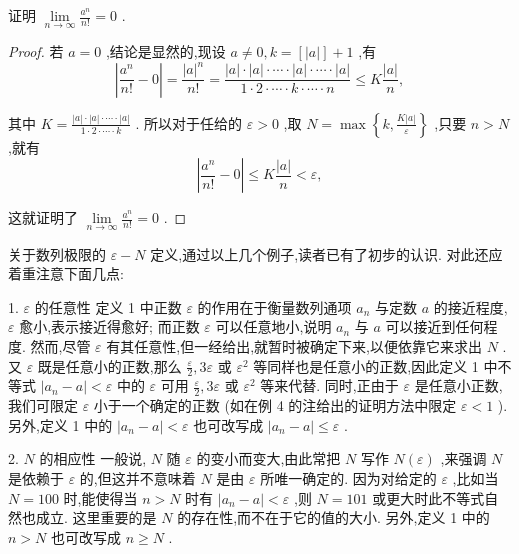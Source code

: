 \begin{example}
证明 \(\mathop{\lim }\limits_{{n \rightarrow  \infty }}\frac{{a}^{n}}{n!} = 0\) .
\end{example}


\begin{proof}
若 \(a = 0\) ,结论是显然的,现设 \(a \neq  0,k = \left\lbrack  \left| a\right| \right\rbrack   + 1\) ,有
\[
\left| {\frac{{a}^{n}}{n!} - 0}\right|  = \frac{{\left| a\right| }^{n}}{n!} = \frac{\left| a\right|  \cdot  \left| a\right|  \cdot  \cdots  \cdot  \left| a\right|  \cdot  \cdots  \cdot  \left| a\right| }{1 \cdot  2 \cdot  \cdots  \cdot  k \cdot  \cdots  \cdot  n} \leq  K\frac{\left| a\right| }{n},
\]

其中 \(K = \frac{\left| a\right|  \cdot  \left| a\right|  \cdot  \cdots  \cdot  \left| a\right| }{1 \cdot  2 \cdot  \cdots  \cdot  k}\) . 所以对于任给的 \(\varepsilon  > 0\) ,取 \(N = \max \left\{  {k,\frac{K\left| a\right| }{\varepsilon }}\right\}\) ,只要 \(n > N\) ,就有
\[
\left| {\frac{{a}^{n}}{n!} - 0}\right|  \leq  K\frac{\left| a\right| }{n} < \varepsilon ,
\]

这就证明了 \(\mathop{\lim }\limits_{{n \rightarrow  \infty }}\frac{{a}^{n}}{n!} = 0\) .

\end{proof}


关于数列极限的 \(\varepsilon  - N\) 定义,通过以上几个例子,读者已有了初步的认识. 对此还应着重注意下面几点:

1. \(\varepsilon\) 的任意性 定义 1 中正数 \(\varepsilon\) 的作用在于衡量数列通项 \({a}_{n}\) 与定数 \(a\) 的接近程度, \(\varepsilon\) 愈小,表示接近得愈好; 而正数 \(\varepsilon\) 可以任意地小,说明 \({a}_{n}\) 与 \(a\) 可以接近到任何程度. 然而,尽管 \(\varepsilon\) 有其任意性,但一经给出,就暂时被确定下来,以便依靠它来求出 \(N\) . 又 \(\varepsilon\) 既是任意小的正数,那么 \(\frac{\varepsilon }{2},{3\varepsilon }\) 或 \({\varepsilon }^{2}\) 等同样也是任意小的正数,因此定义 1 中不等式 \(\left| {{a}_{n} - a}\right|  < \varepsilon\) 中的 \(\varepsilon\) 可用 \(\frac{\varepsilon }{2},{3\varepsilon }\) 或 \({\varepsilon }^{2}\) 等来代替. 同时,正由于 \(\varepsilon\) 是任意小正数,我们可限定 \(\varepsilon\) 小于一个确定的正数 (如在例 4 的注给出的证明方法中限定 \(\varepsilon  < 1\) ). 另外,定义 1 中的 \(\left| {{a}_{n} - a}\right|  < \varepsilon\) 也可改写成 \(\left| {{a}_{n} - a}\right|  \leq  \varepsilon\) .

2. \(N\) 的相应性 一般说, \(N\) 随 \(\varepsilon\) 的变小而变大,由此常把 \(N\) 写作 \(N\left( \varepsilon \right)\) ,来强调 \(N\) 是依赖于 \(\varepsilon\) 的,但这并不意味着 \(N\) 是由 \(\varepsilon\) 所唯一确定的. 因为对给定的 \(\varepsilon\) ,比如当 \(N =100\) 时,能使得当 \(n > N\) 时有 \(\left| {{a}_{n} - a}\right|  < \varepsilon\) ,则 \(N = {101}\) 或更大时此不等式自然也成立. 这里重要的是 \(N\) 的存在性,而不在于它的值的大小. 另外,定义 1 中的 \(n > N\) 也可改写成 \(n \geq  N\) .

